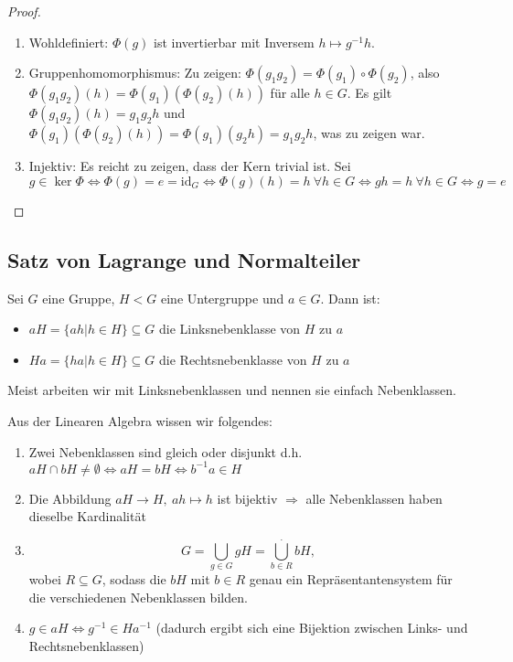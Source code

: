 \documentclass[12pt,a4paper]{scrartcl}
\begin{document}
\begin{proof}
	\leavevmode
	\begin{enumerate}
	\item Wohldefiniert: $\Phi(g)$ ist invertierbar mit Inversem $h\mapsto g^{-1}h$.	
	\item Gruppenhomomorphismus: Zu zeigen: $\Phi(g_1g_2) = \Phi(g_1)\circ \Phi(g_2)$, also $\Phi(g_1g_2)(h) = \Phi(g_1)(\Phi(g_2)(h))$ für alle $h\in G$. Es gilt $\Phi(g_1g_2)(h) = g_1g_2h$ und $\Phi(g_1)(\Phi(g_2)(h))  = \Phi(g_1)(g_2h) = g_1g_2h$, was zu zeigen war.
	
	\item Injektiv: Es reicht zu zeigen, dass der Kern trivial ist. Sei $g\in \ker\Phi\Leftrightarrow \Phi(g) = e = \text{id}_G \Leftrightarrow \Phi(g)(h)= h ~ \forall h\in G\Leftrightarrow gh = h ~ \forall h\in G\Leftrightarrow g= e$
	\qedhere
	\end{enumerate}
\end{proof}


\subsection{Satz von Lagrange und Normalteiler}
\begin{defi}
	Sei $G$ eine Gruppe, $H<G$ eine Untergruppe und $a\in G$. Dann ist:
	\begin{itemize}
		\item[] $aH = \{ah|h\in H\}\subseteq G$ die Linksnebenklasse von $H$ zu $a$
		\item[] $Ha = \{ha|h\in H\}\subseteq G$ die Rechtsnebenklasse von $H$ zu $a$
	\end{itemize}
	Meist arbeiten wir mit Linksnebenklassen und nennen sie einfach Nebenklassen.
\end{defi}

\noindent
Aus der Linearen Algebra wissen wir folgendes: \begin{enumerate}
	\item Zwei Nebenklassen sind gleich oder disjunkt d.h. $aH\cap bH \neq \emptyset \Leftrightarrow aH = bH\Leftrightarrow b^{-1}a \in H$
	\item Die Abbildung $aH\to H,\ ah\mapsto h$ ist bijektiv $\Rightarrow$ alle Nebenklassen haben dieselbe Kardinalität
	\item $$ G = \bigcup\limits_{g\in G}gH = \overset{.}{\bigcup\limits_{b\in R} }bH, $$ wobei $R\subseteq G$, sodass die $bH$ mit $b\in R$ genau ein Repräsentantensystem für die verschiedenen Nebenklassen bilden.
	\item $g\in aH\Leftrightarrow g^{-1}\in Ha^{-1}$ (dadurch ergibt sich eine Bijektion zwischen Links- und Rechtsnebenklassen)
	
\end{enumerate}
\end{document}
